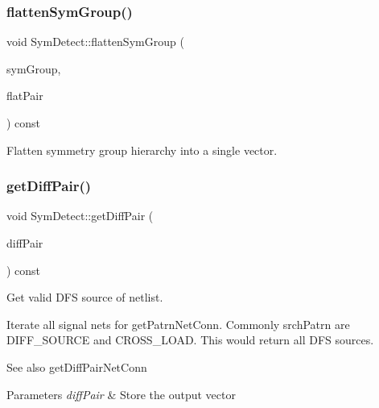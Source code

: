 \subsubsection{\texorpdfstring{flatten\+Sym\+Group()}{flattenSymGroup()}}
{\footnotesize\ttfamily void Sym\+Detect\+::flatten\+Sym\+Group (\begin{DoxyParamCaption}\item[{std\+::vector$<$ std\+::vector$<$ \hyperlink{classMosPair}{Mos\+Pair} $>$$>$ \&}]{sym\+Group,  }\item[{std\+::vector$<$ \hyperlink{classMosPair}{Mos\+Pair} $>$ \&}]{flat\+Pair }\end{DoxyParamCaption}) const\hspace{0.3cm}{\ttfamily [private]}}



Flatten symmetry group hierarchy into a single vector. 

\mbox{\label{classSymDetect_af04b93dac7e090cef8e741d8d1812485}} 
\subsubsection{\texorpdfstring{get\+Diff\+Pair()}{getDiffPair()}}
{\footnotesize\ttfamily void Sym\+Detect\+::get\+Diff\+Pair (\begin{DoxyParamCaption}\item[{std\+::vector$<$ \hyperlink{classMosPair}{Mos\+Pair} $>$ \&}]{diff\+Pair }\end{DoxyParamCaption}) const\hspace{0.3cm}{\ttfamily [private]}}



Get valid D\+FS source of netlist. 

Iterate all signal nets for get\+Patrn\+Net\+Conn. Commonly srch\+Patrn are D\+I\+F\+F\+\_\+\+S\+O\+U\+R\+CE and C\+R\+O\+S\+S\+\_\+\+L\+O\+AD. This would return all D\+FS sources.

\begin{DoxySeeAlso}{See also}
get\+Diff\+Pair\+Net\+Conn 
\end{DoxySeeAlso}

\begin{DoxyParams}{Parameters}
{\em diff\+Pair} & Store the output vector \\
\hline
\end{DoxyParams}
\mbox{\label{classSymDetect_aa6d2ec13048f8f7e18e659bf8ac31dee}} 
